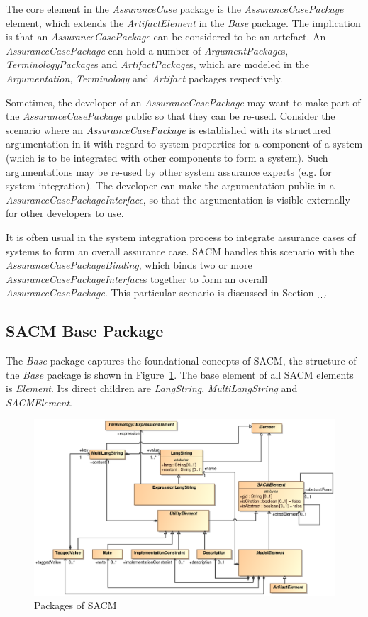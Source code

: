 The core element in the \textit{AssuranceCase} package is the \textit{AssuranceCasePackage} element, which extends the \textit{ArtifactElement} in the \textit{Base} package. The implication is that an \textit{AssuranceCasePackage} can be considered to be an artefact. An \textit{AssuranceCasePackage} can hold a number of \textit{ArgumentPackage}s, \textit{TerminologyPackage}s and \textit{ArtifactPackage}s, which are modeled in the \textit{Argumentation}, \textit{Terminology} and \textit{Artifact} packages respectively.

Sometimes, the developer of an \textit{AssuranceCasePackage} may want to make part of the \textit{AssuranceCasePackage} public so that they can be re-used. Consider the scenario where an \textit{AssuranceCasePackage} is established with its structured argumentation in it with regard to system properties for a component of a system (which is to be integrated with other components to form a system). Such argumentations may be re-used by other system assurance experts (e.g. for system integration). The developer can make the argumentation public in a \textit{AssuranceCasePackageInterface}, so that the argumentation is visible externally for other developers to use. 

It is often usual in the system integration process to integrate assurance cases of systems to form an overall assurance case. SACM handles this scenario with the \textit{AssuranceCasePackageBinding}, which binds two or more \textit{AssuranceCasePackageInterface}s together to form an overall \textit{AssuranceCasePackage}. This particular scenario is discussed in Section~\ref{}.

\subsection{SACM Base Package}
\label{sec:basePack}
The \textit{Base} package captures the foundational concepts of SACM, the structure of the \textit{Base} package is shown in Figure~\ref{fig:base}. The base element of all SACM elements is \textit{Element}. Its direct children are \textit{LangString}, \textit{MultiLangString} and \textit{SACMElement}.
\begin{figure}
	\centering
	\includegraphics[width=1\linewidth]{fig/Base.eps}
	\caption{Packages of SACM}
	\label{fig:base}
\end{figure}

